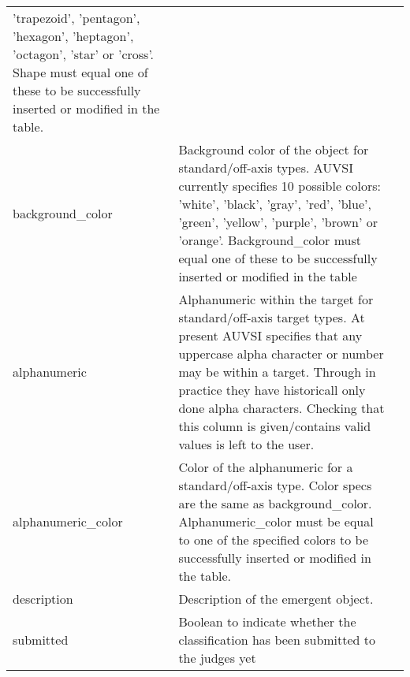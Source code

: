 \begin{longtable}{|p{\varnamewidth}|p{\vardescrwidth}|l}
          'trapezoid', 'pentagon', 'hexagon', 'heptagon', 'octagon', 'star'
          or 'cross'. Shape must equal one of these to be successfully 
          inserted or modified in the table.&\\
\cline{1-2}
\raggedright b\-a\-c\-k\-g\-r\-o\-u\-n\-d\-\_\-c\-o\-l\-o\-r\- & \raggedright Background color of the object for standard/off-axis types. AUVSI
          currently specifies 10 possible colors: 'white', 'black', 'gray',
          'red', 'blue', 'green', 'yellow', 'purple', 'brown' or 'orange'. 
          Background\_color must equal one of these to be successfully 
          inserted or modified in the table&\\
\cline{1-2}
\raggedright a\-l\-p\-h\-a\-n\-u\-m\-e\-r\-i\-c\- & \raggedright Alphanumeric within the target for standard/off-axis target 
          types. At present AUVSI specifies that any uppercase alpha 
          character or number may be within a target. Through in practice 
          they have historicall only done alpha characters. Checking that 
          this column is given/contains valid values is left to the user.&\\
\cline{1-2}
\raggedright a\-l\-p\-h\-a\-n\-u\-m\-e\-r\-i\-c\-\_\-c\-o\-l\-o\-r\- & \raggedright Color of the alphanumeric for a standard/off-axis type. Color 
          specs are the same as background\_color. Alphanumeric\_color must
          be equal to one of the specified colors to be successfully 
          inserted or modified in the table.&\\
\cline{1-2}
\raggedright d\-e\-s\-c\-r\-i\-p\-t\-i\-o\-n\- & \raggedright Description of the emergent object.&\\
\cline{1-2}
\raggedright s\-u\-b\-m\-i\-t\-t\-e\-d\- & \raggedright Boolean to indicate whether the classification has been submitted
          to the judges yet&\\
\cline{1-2}
\end{longtable}

